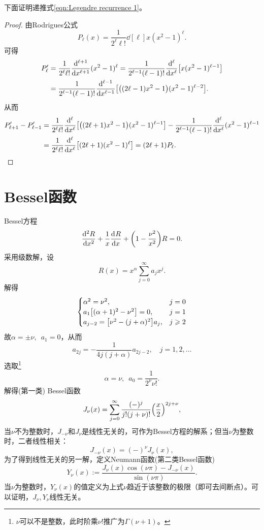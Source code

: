 下面证明递推式\eqref{eqn:Legendre recurrence 1}。
\begin{proof}
    由Rodrigues公式
    \begin{equation}
        P_\ell(x) = \frac1{2^\ell\ell!}\dd[\ell]x(x^2 - 1)^\ell.
    \end{equation}
    可得
    \begin{align*}
        P'_\ell &= \frac1{2^\ell\ell!}\dd[\ell + 1]x(x^2 - 1)^\ell = \frac1{2^{\ell-1}(\ell - 1)!}\dd[\ell]x\bigb{x(x^2 - 1)^{\ell-1}}\\
        &= \frac1{2^{\ell-1}(\ell - 1)!}\dd[\ell - 1]x\bigb{\bigp{(2\ell - 1)x^2 - 1}(x^2 - 1)^{\ell-2}}.
    \end{align*}
    从而 
    \begin{align*}
        P_{\ell+1}' - P_{\ell-1}' &= \frac1{2^\ell\ell!}\dd[\ell]x\bigb{\bigp{(2\ell + 1)x^2 - 1}(x^2 - 1)^{\ell-1}} - \frac1{2^{\ell-1}(\ell - 1)!}\dd[\ell]x(x^2 - 1)^{\ell-1}\\
        &= \frac1{2^\ell\ell!}\dd[\ell]x\bigb{(2\ell + 1)(x^2 - 1)^\ell} = (2\ell + 1)P_\ell.\qedhere
    \end{align*}
\end{proof}


\section{Bessel函数}
\label{sec:Bessel function}

Bessel方程
\begin{equation}
    \dv[2]Rx + \frac1x\dv Rx + \biggp{1 - \frac{\nu^2}{x^2}}R = 0.
\end{equation}
采用级数解，设 
\[
    R(x) = x^\alpha\sum_{j=0}^\infty a_jx^j.
\]
解得
\[
    \begin{cases}
        \alpha^2 = \nu^2,&j = 0\\
        a_1\bigb{(\alpha + 1)^2 - \nu^2} = 0,&j = 1\\
        a_{j-2} = \bigb{\nu^2 - (j + \alpha)^2}a_j,&j \geqslant 2
    \end{cases}
\]
故$\alpha = \pm\nu,\enspace a_1 = 0$，从而
\[
    a_{2j} = -\frac1{4j(j + \alpha)}a_{2j-2},\quad j = 1,2,\ldots
\]
选取\footnote{$\nu$可以不是整数，此时阶乘$\nu!$推广为$\Gamma(\nu + 1)$。}
\[
    \alpha = \nu,\enspace a_0 = \frac1{2^\nu\nu!}.
\]
解得(第一类) Bessel函数
\begin{equation}
    J_\nu(x) = \sum_{j=0}^\infty\frac{(-)^j}{j!(j + \nu)!}\Bigp{\frac x2}^{2j+\nu},
\end{equation}
当$\nu$不为整数时，$J_{-\nu}$和$J_\nu$是线性无关的，可作为Bessel方程的解系；但当$\nu$为整数时，二者线性相关：
\begin{equation}
    \label{eq:ed-bessel-integer-reflection}
    J_{-\nu}(x) = (-)^\nu J_\nu(x),
\end{equation}
为了得到线性无关的另一解，定义Neumann函数(第二类Bessel函数)
\begin{equation}
    Y_\nu(x) := \frac{J_\nu(x)\cos(\nu\pi) - J_{-\nu}(x)}{\sin(\nu\pi)}.
\end{equation}
当$\nu$为整数时，$Y_\nu(x)$的值定义为上式$\nu$趋近于该整数的极限（即可去间断点）。可以证明，$J_\nu,Y_\nu$线性无关。

